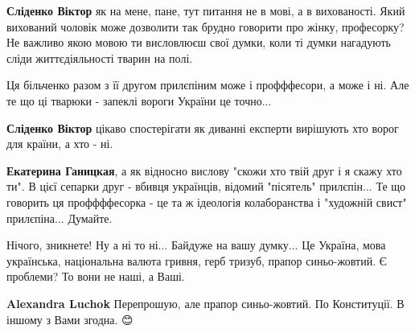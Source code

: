 \begin{itemize}
\begin{itemize}

\textbf{Сліденко Віктор} як на мене, пане, тут питання не в мові, а в вихованості. Який вихований чоловік може дозволити так брудно говорити про жінку, професорку?
Не важливо якою мовою ти висловлюєш свої думки, коли ті думки нагадують сліди життєдіяльності тварин на полі.


Ця більченко разом з її другом прилєпіним може і профффесори, а може і ні. Але те що ці тварюки - запеклі вороги України це точно...


\textbf{Сліденко Віктор} цікаво спостерігати як диванні експерти вирішують хто ворог для країни, а хто - ні.


\textbf{Екатерина Ганицкая}, а як відносно вислову "скожи хто твій друг і я скажу хто ти". В цієї сепарки друг - вбивця українців, відомий "пісятель" прилєпін... Те що говорить ця проффффесорка - це та ж ідеологія колаборанства і "художній свист" прилєпіна... Думайте.
\end{itemize}



Нічого, зникнете! Ну а ні то ні... Байдуже на вашу думку... Це Україна, мова
українська, національна валюта гривня, герб тризуб, прапор синьо-жовтий. Є
проблеми? То вони не наші, а Ваші.

\begin{itemize}


\textbf{Alexandra Luchok} Перепрошую, але прапор синьо-жовтий. По Конституції. В іншому з Вами згодна. 😊



\end{itemize}
\end{itemize}
